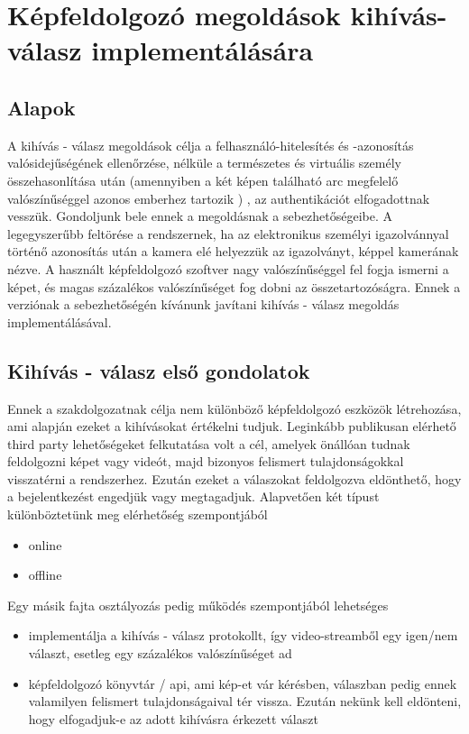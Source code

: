 \section{Képfeldolgozó megoldások kihívás-válasz implementálására}
\subsection{Alapok}
A kihívás - válasz megoldások célja a felhasználó-hitelesítés és -azonosítás valósidejűségének ellenőrzése, nélküle a természetes és virtuális személy összehasonlítása után (amennyiben a két képen található arc megfelelő valószínűséggel azonos emberhez tartozik ) , az authentikációt elfogadottnak vesszük.
Gondoljunk bele ennek a megoldásnak a sebezhetőségeibe. A legegyszerűbb feltörése a rendszernek, ha az elektronikus személyi igazolvánnyal történő azonosítás után a kamera elé helyezzük az igazolványt, képpel kamerának nézve. A használt képfeldolgozó szoftver nagy valószínűséggel fel fogja ismerni a képet, és magas százalékos valószínűséget fog dobni az összetartozóságra. Ennek a verziónak a sebezhetőségén kívánunk javítani kihívás - válasz megoldás implementálásával.
\subsection{Kihívás - válasz első gondolatok}
Ennek a szakdolgozatnak célja nem különböző képfeldolgozó eszközök létrehozása, ami alapján ezeket a kihívásokat értékelni tudjuk. Leginkább publikusan elérhető third party lehetőségeket felkutatása volt a cél, amelyek önállóan tudnak feldolgozni képet vagy videót, majd bizonyos felismert tulajdonságokkal visszatérni a rendszerhez. Ezután ezeket a válaszokat feldolgozva eldönthető, hogy a bejelentkezést engedjük vagy megtagadjuk.
Alapvetően két típust különböztetünk meg elérhetőség szempontjából
\begin{itemize}
\item online
\item offline
\end{itemize}
Egy másik fajta osztályozás pedig működés szempontjából lehetséges
\begin{itemize}
\item implementálja a kihívás - válasz protokollt, így video-streamből egy igen/nem választ, esetleg egy százalékos valószínűséget ad
\item képfeldolgozó könyvtár / api, ami kép-et vár kérésben, válaszban pedig ennek valamilyen felismert tulajdonságaival tér vissza. Ezután nekünk kell eldönteni, hogy elfogadjuk-e az adott kihívásra érkezett választ
\end{itemize}


